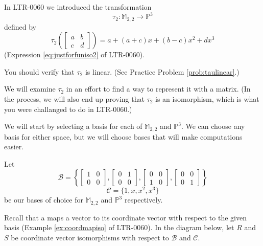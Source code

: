 \documentclass{ximera}
\begin{document}
\begin{exploration}\label{init:taumatrix}
In LTR-0060 we introduced the transformation
$$\tau_2:\mathbb{M}_{2,2}\rightarrow\mathbb{P}^3$$
defined by
$$\tau_2\left(\begin{bmatrix}a&b\\c&d\end{bmatrix}\right)=a+(a+c)x+(b-c)x^2+dx^3$$
(Expression \ref{eq:justforfuniso2} of LTR-0060).

You should verify that $\tau_2$ is linear.  (See Practice Problem \ref{prob:taulinear}.)

We will examine $\tau_2$ in an effort to find a way to represent it with a matrix.  (In the process, we will also end up proving that $\tau_2$ is an isomorphism, which is what you were challanged to do in LTR-0060.)

We will start by selecting a basis for each of $\mathbb{M}_{2,2}$ and $\mathbb{P}^3$.  We can choose any basis for either space, but we will choose bases that will make computations easier.

Let 
$$\mathcal{B}=\left\{\begin{bmatrix}1&0\\0&0\end{bmatrix}, \begin{bmatrix}0&1\\0&0\end{bmatrix}, \begin{bmatrix}0&0\\1&0\end{bmatrix}, \begin{bmatrix}0&0\\0&1\end{bmatrix}\right\}$$
$$\mathcal{C}=\{1, x, x^2, x^3\}$$
be our bases of choice for $\mathbb{M}_{2,2}$ and $\mathbb{P}^3$ respectively.

Recall that a  maps a vector to its coordinate vector with respect to the given basis (Example \ref{ex:coordmapiso} of LTR-0060).  In the diagram below, let $R$ and $S$ be coordinate vector isomorphisms with respect to $\mathcal{B}$ and $\mathcal{C}$.

\begin{center}
\end{center}
\end{exploration}
\end{document}

